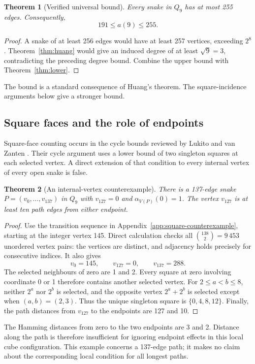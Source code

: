 \documentclass[11pt,a4paper]{article}
\newtheorem{theorem}{Theorem}[section]
\theoremstyle{definition}
\theoremstyle{remark}
\newcommand{\Q}{Q}
\begin{document}
\begin{theorem}[Verified universal bound]\label{thm:upper}
Every snake in $\Q_9$ has at most 255 edges. Consequently,
\[
\boxed{191\le a(9)\le255.}
\]
\end{theorem}
\begin{proof}
A snake of at least 256 edges would have at least 257 vertices, exceeding $2^8$. Theorem~\ref{thm:huang} would give an induced degree of at least $\sqrt9=3$, contradicting the preceding degree bound. Combine the upper bound with Theorem~\ref{thm:lower}.
\end{proof}
The bound is a standard consequence of Huang's theorem. The square-incidence arguments below give a stronger bound.

\subsection{Square faces and the role of endpoints}
Square-face counting occurs in the cycle bounds reviewed by Lukito and van Zanten \cite{lukito}. Their cycle argument uses a lower bound of two singleton squares at each selected vertex. A direct extension of that condition to every internal vertex of every open snake is false.

\begin{theorem}[An internal-vertex counterexample]\label{thm:square-counterexample}
There is a 137-edge snake $P=(v_0,\ldots,v_{137})$ in $\Q_9$ with $v_{127}=0$ and $\alpha_{V(P)}(0)=1$. The vertex $v_{127}$ is at least ten path edges from either endpoint.
\end{theorem}
\begin{proof}
Use the transition sequence in Appendix~\ref{app:square-counterexample}, starting at the integer vertex 145. Direct calculation checks all $\binom{138}{2}=9\,453$ unordered vertex pairs: the vertices are distinct, and adjacency holds precisely for consecutive indices. It also gives
\[
v_0=145,\qquad v_{127}=0,\qquad v_{137}=288.
\]
The selected neighbours of zero are 1 and 2. Every square at zero involving coordinate 0 or 1 therefore contains another selected vertex. For $2\le a<b\le8$, neither $2^a$ nor $2^b$ is selected, and the opposite vertex $2^a+2^b$ is selected except when $(a,b)=(2,3)$. Thus the unique singleton square is $\{0,4,8,12\}$. Finally, the path distances from $v_{127}$ to the endpoints are 127 and 10.
\end{proof}
The Hamming distances from zero to the two endpoints are 3 and 2. Distance along the path is therefore insufficient for ignoring endpoint effects in this local cube configuration. This example concerns a 137-edge path; it makes no claim about the corresponding local condition for all longest paths.
\end{document}
